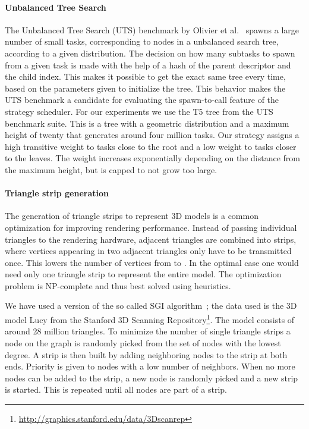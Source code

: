 \documentclass[a4paper,11pt]{article}
\begin{document}
\paragraph{Unbalanced Tree Search}
\label{sec:uts}

The Unbalanced Tree Search (UTS) benchmark by Olivier et
al.~\cite{olivier2007} spawns a large number of small tasks,
corresponding to nodes in a unbalanced search tree, according to a
given distribution.  The decision on how many subtasks to spawn from a
given task is made with the help of a hash of the parent descriptor
and the child index. This makes it possible to get the exact same tree
every time, based on the parameters given to initialize the tree.
This behavior makes the UTS benchmark a candidate for evaluating the
spawn-to-call feature of the strategy scheduler. For our experiments
we use the T5 tree from the UTS benchmark suite. This is a tree with a
geometric distribution and a maximum height of twenty that generates
around four million tasks. Our strategy assigns a high transitive
weight to tasks close to the root and a low weight to tasks closer to
the leaves.  The weight increases exponentially depending on the
distance from the maximum height, but is capped to not grow too large.

\paragraph{Triangle strip generation}



The generation of triangle strips to represent 3D models is a common
optimization for improving rendering performance. Instead of passing
individual triangles to the rendering hardware, adjacent triangles are
combined into strips, where vertices appearing in two adjacent
triangles only have to be transmitted once. This lowers the number of
vertices from  to .  In the optimal case one would need only
one triangle strip to represent the entire model. The optimization problem
is NP-complete and thus best solved using heuristics.

We have used a version of the so called SGI algorithm~\cite{evans96};
the data used is the 3D model Lucy from the Stanford 3D Scanning
Repository\footnote{\url{http://graphics.stanford.edu/data/3Dscanrep}}.
The model consists of around 28 million triangles.  To minimize the
number of single triangle strips a node on the graph is randomly
picked from the set of nodes with the lowest degree.  A strip is then
built by adding neighboring nodes to the strip at both ends. Priority
is given to nodes with a low number of neighbors. When no more nodes
can be added to the strip, a new node is randomly picked and a new
strip is started. This is repeated until all nodes are part of a
strip.
\end{document}
